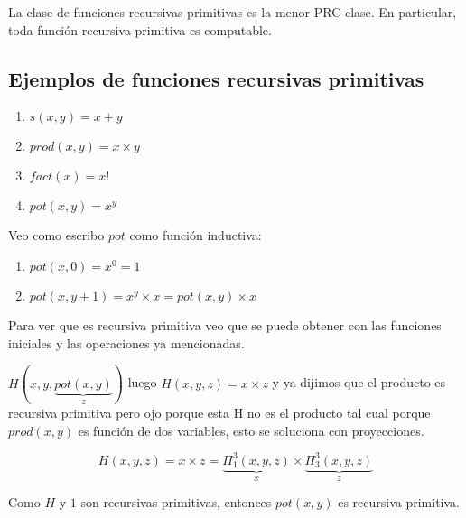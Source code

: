 \begin{observation}
La clase de funciones recursivas primitivas es la menor PRC-clase. En particular, toda funci\'on recursiva primitiva es computable.
\end{observation}
 
\subsection{Ejemplos de funciones recursivas primitivas}
 
\begin{enumerate}
	\item $s(x, y) = x + y$
	\item $prod(x, y) = x \times y$
	\item $fact(x) = x!$
	\item $pot(x, y) = x^{y}$
\end{enumerate}
 
\begin{example}
Veo como escribo $pot$ como funci\'on inductiva:
	\begin{enumerate}
		\item[] $pot(x, 0) = x^{0} = 1$
		\item[] $pot(x, y + 1) = x^{y} \times x = pot(x, y) \times x$
	\end{enumerate}
	Para ver que es recursiva primitiva veo que se puede obtener con las funciones iniciales y las operaciones ya mencionadas.
	
	$H(x, y, \underbrace{pot(x, y)}_{z})$ luego $H(x, y, z) = x \times z$ y ya dijimos que el producto es recursiva primitiva pero ojo porque esta H no es el producto tal cual  porque $prod(x, y)$ es funci\'on de dos variables, esto se soluciona con proyecciones.
	
	\[
		H(x, y, z) = x \times z = \underbrace{\varPi_{1}^{3}(x, y, z)}_{x} \times \underbrace{\varPi_{3}^{3}(x, y, z)}_{z}
	\]
	
Como $H$ y $1$ son recursivas primitivas, entonces $pot(x, y)$ es recursiva primitiva.
\end{example}
 
